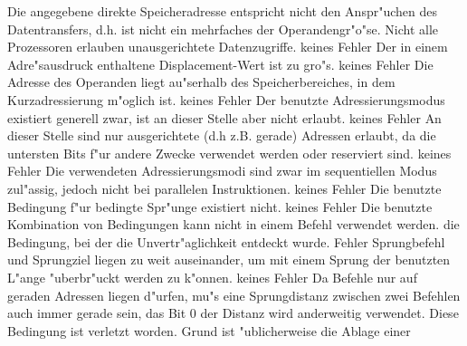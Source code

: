 \documentclass[12pt,a4paper,twoside]{report}
\begin{document}
\begin{description}
               {Die angegebene direkte Speicheradresse
                entspricht nicht den Anspr"uchen des Datentransfers, d.h.
                ist nicht ein mehrfaches der Operandengr"o"se.  Nicht alle
                Prozessoren erlauben unausgerichtete Datenzugriffe.}
               {keines}
               {Fehler}
               {Der in einem Adre"sausdruck enthaltene
                Displacement-Wert ist zu gro"s.}
               {keines}
               {Fehler}
               {Die Adresse des Operanden liegt au"serhalb des
                Speicherbereiches, in dem Kurzadressierung m"oglich ist.}
               {keines}
               {Fehler}
               {Der benutzte Adressierungsmodus existiert
                generell zwar, ist an dieser Stelle aber nicht erlaubt.}
               {keines}
               {Fehler}
               {An dieser Stelle sind nur ausgerichtete
                (d.h z.B. gerade) Adressen erlaubt, da die untersten Bits f"ur
                andere Zwecke verwendet werden oder reserviert sind.}
               {keines}
               {Fehler}
               {Die verwendeten Adressierungsmodi
                sind zwar im sequentiellen Modus zul"assig, jedoch nicht
                bei parallelen Instruktionen.}
               {keines}
               {Fehler}
               {Die benutzte Bedingung f"ur bedingte Spr"unge
                existiert nicht.}
               {keines}
               {Fehler}
               {Die benutzte Kombination von Bedingungen kann nicht
                in einem Befehl verwendet werden.}
               {die Bedingung, bei der die Unvertr"aglichkeit
                entdeckt wurde.}
               {Fehler}
               {Sprungbefehl und Sprungziel liegen zu weit
                auseinander, um mit einem Sprung der benutzten L"ange
                "uberbr"uckt werden zu k"onnen.}
               {keines}
               {Fehler}
               {Da Befehle nur auf geraden Adressen liegen
                d"urfen, mu"s eine Sprungdistanz zwischen zwei Befehlen
                auch immer gerade sein, das Bit 0 der Distanz wird
                anderweitig verwendet.  Diese Bedingung ist verletzt
                worden.  Grund ist "ublicherweise die Ablage einer
}
\end{description}
\end{document}
